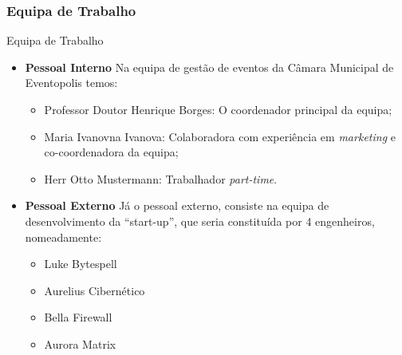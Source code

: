 \documentclass[compress,svgnames,handout,13.7pt]{beamer}
\begin{document}
\subsubsection{Equipa de Trabalho}
\begin{frame}{Equipa de Trabalho}
\begin{itemize}
                 \item{\textbf{Pessoal Interno}}
                   Na equipa de gest\~ao de eventos da C\^amara Municipal de Eventopolis temos:
                   \begin{itemize}
                     \item{Professor Doutor Henrique Borges:} O coordenador principal da equipa;
                     \item{Maria Ivanovna Ivanova:} Colaboradora com experi\^encia em \textit{marketing} e co-coordenadora
                       da equipa;
                     \item{Herr Otto Mustermann:} Trabalhador \textit{part-time}.
                   \end{itemize}
                 \item{\textbf{Pessoal Externo}}
                   Já o pessoal externo, consiste na equipa de desenvolvimento da ``start-up'',
                   que seria constituída por 4 engenheiros, nomeadamente:
                   \begin{itemize}
                     \item Luke Bytespell
                     \item Aurelius Cibern\'etico
                     \item Bella Firewall
                     \item Aurora Matrix
                   \end{itemize}
             \end{itemize}
\end{frame}
\end{document}

